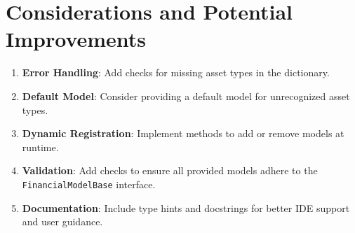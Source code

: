 \documentclass{article}
\begin{document}
\section{Considerations and Potential Improvements}

\begin{enumerate}
    \item \textbf{Error Handling}: Add checks for missing asset types in the dictionary.
    \item \textbf{Default Model}: Consider providing a default model for unrecognized asset types.
    \item \textbf{Dynamic Registration}: Implement methods to add or remove models at runtime.
    \item \textbf{Validation}: Add checks to ensure all provided models adhere to the \texttt{FinancialModelBase} interface.
    \item \textbf{Documentation}: Include type hints and docstrings for better IDE support and user guidance.
\end{enumerate}
\end{document}
